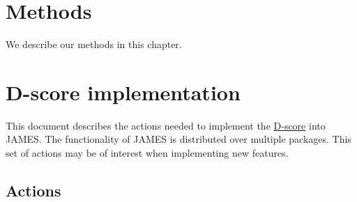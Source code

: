 \documentclass[
]{book}
\begin{document}
\hypertarget{methods}{%
\chapter{Methods}\label{methods}}

We describe our methods in this chapter.

\hypertarget{d-score-implementation}{%
\chapter{D-score implementation}\label{d-score-implementation}}

This document describes the actions needed to implement the
\href{https://stefvanbuuren.name/dbook1/}{D-score} into JAMES. The functionality of JAMES is distributed over multiple packages. This set of actions may be of interest when implementing new features.

\hypertarget{actions}{%
\section{Actions}\label{actions}}
\end{document}
